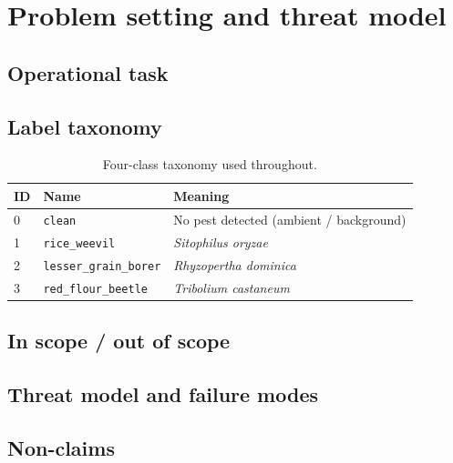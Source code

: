\section{Problem setting and threat model}
\label{sec:problem}

\subsection{Operational task}

\subsection{Label taxonomy}
\begin{table}[H]
\centering
\caption{Four-class taxonomy used throughout.}
\label{tab:classes}
\begin{tabular}{@{}llp{6cm}@{}}
\toprule
ID & Name & Meaning \\
\midrule
0 & \texttt{clean} & No pest detected (ambient / background) \\
1 & \texttt{rice\_weevil} & \textit{Sitophilus oryzae} \\
2 & \texttt{lesser\_grain\_borer} & \textit{Rhyzopertha dominica} \\
3 & \texttt{red\_flour\_beetle} & \textit{Tribolium castaneum} \\
\bottomrule
\end{tabular}
\end{table}

\subsection{In scope / out of scope}

\subsection{Threat model and failure modes}

\subsection{Non-claims}
